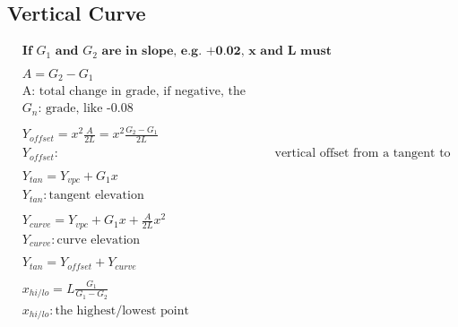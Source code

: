 \documentclass{article}
\begin{document}
  \subsection{Vertical Curve}
  \begin{align*}
    & \textbf{If $G_1$ and $G_2$ are in slope, e.g. +0.02, x and L must in feet}\\
    \\
    & A = G_2 - G_1  \\
    & \text{A: total change in grade, if negative, the curve is below the tangent}\\
    & \text{$G_n$: grade, like -0.08} \\
    \\
    & Y_{offset} = x^2 \frac{A}{2L} = x^2 \frac{G_2 - G_1}{2L} \\
    & Y_{offset}: & \text{vertical offset from a tangent to a parabola, maybe negative!!!} \\
    \\
    & Y_{tan} = Y_{vpc} + G_1x \\
    & Y_{tan}: \text{tangent elevation} \\
    \\
    & Y_{curve} = Y_{vpc} + G_1x + \frac{A}{2L}x^2 \\
    & Y_{curve}: \text{curve elevation} \\
    \\
    & Y_{tan} = Y_{offset} + Y_{curve} \\
    \\
    & x_{hi/lo} = L \frac{G_1}{G_1 - G_2} \\
    & x_{hi/lo}: \text{the highest/lowest point}\\
  \end{align*}
\end{document}
